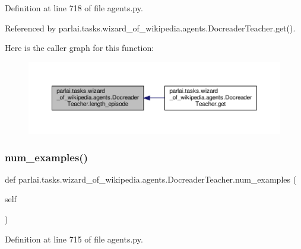 Definition at line 718 of file agents.\+py.



Referenced by parlai.\+tasks.\+wizard\+\_\+of\+\_\+wikipedia.\+agents.\+Docreader\+Teacher.\+get().

Here is the caller graph for this function\+:
\nopagebreak
\begin{figure}[H]
\begin{center}
\leavevmode
\includegraphics[width=350pt]{classparlai_1_1tasks_1_1wizard__of__wikipedia_1_1agents_1_1DocreaderTeacher_a1cb75f751dfa0b36d0f5c641c82be6c5_icgraph}
\end{center}
\end{figure}
\mbox{\label{classparlai_1_1tasks_1_1wizard__of__wikipedia_1_1agents_1_1DocreaderTeacher_a19d99509fbf9887048b14676d0c54df7}} 
\subsubsection{\texorpdfstring{num\+\_\+examples()}{num\_examples()}}
{\footnotesize\ttfamily def parlai.\+tasks.\+wizard\+\_\+of\+\_\+wikipedia.\+agents.\+Docreader\+Teacher.\+num\+\_\+examples (\begin{DoxyParamCaption}\item[{}]{self }\end{DoxyParamCaption})}



Definition at line 715 of file agents.\+py.



